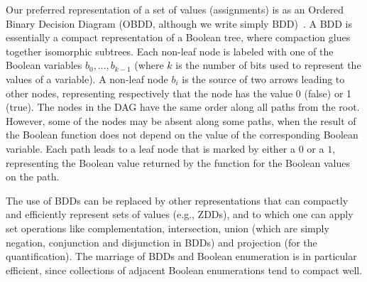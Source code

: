 Our preferred representation of a set of values 
(assignments) is as an Ordered Binary Decision
Diagram (OBDD, although we write simply BDD)~\cite{Bryant}.
A BDD is essentially a compact representation 
of a Boolean tree, where compaction glues together isomorphic subtrees. Each non-leaf node is labeled with one of the
Boolean variables $b_0,\ldots,b_{k-1}$ (where $k$ is the number of bits used to represent the values of a variable). A non-leaf node $b_i$ 
is the source of two 
arrows leading to other nodes, representing respectively that the node has the value 0 (false) or 1 (true).
The nodes in the DAG have the
same order along all paths from the root. However, some of the nodes may be
absent along some paths, when the result of the Boolean function does not 
depend on the value of the corresponding Boolean variable. Each path leads 
to a leaf node that is marked by either a $0$ or a $1$, representing the 
Boolean value returned by the function for the Boolean values on the path.

The use of BDDs can be replaced by other representations that
can compactly and efficiently represent sets of values (e.g., ZDDs), and to which one can apply set operations like complementation, intersection, union (which are simply negation, conjunction and disjunction
in BDDs) and projection (for the quantification).
The marriage of BDDs and Boolean enumeration is in particular
efficient, since collections of adjacent Boolean enumerations tend to compact well.



%
 
